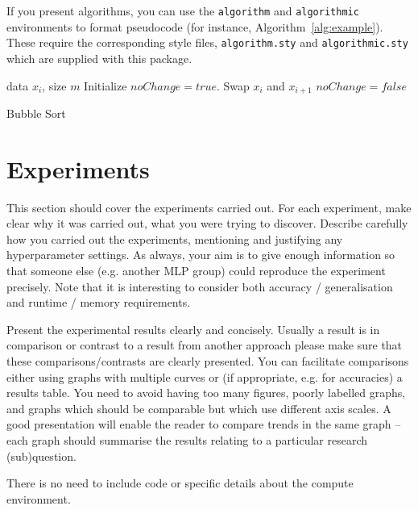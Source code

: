 \documentclass{article}
\begin{document}
If you present algorithms, you can use the \verb+algorithm+ and \verb+algorithmic+ environments to format pseudocode (for instance, Algorithm~\ref{alg:example}). These require the corresponding style files, \verb+algorithm.sty+ and \verb+algorithmic.sty+ which are supplied with this package. 

\begin{algorithm}[ht]
\begin{algorithmic}
    data $x_i$, size $m$
   \REPEAT
   \STATE Initialize $noChange = true$.
   \STATE Swap $x_i$ and $x_{i+1}$
   \STATE $noChange = false$
   \ENDIF
   \ENDFOR
\end{algorithmic}
  \caption{Bubble Sort}
  \label{alg:example}
\end{algorithm}


\section{Experiments}
This section should cover the experiments carried out. For each experiment, make clear why it was carried out, what you were trying to discover. Describe carefully how you carried out the experiments, mentioning and justifying any hyperparameter settings.  As always, your aim is to give enough information so that someone else (e.g. another MLP group) could reproduce the experiment precisely.  Note that it is interesting to consider both accuracy / generalisation and runtime / memory requirements.

Present the experimental results clearly and concisely.  Usually a result is in comparison or contrast to a result from another approach please make sure that these comparisons/contrasts are clearly presented.  You can facilitate comparisons either using graphs with multiple curves or (if appropriate, e.g. for accuracies) a results table. You need to avoid having too many figures, poorly labelled graphs, and graphs which should be comparable but which use different axis scales. A good presentation will enable the reader to compare trends in the same graph -- each graph should summarise the results relating to a particular research (sub)question.

There is no need to include code or specific details about the compute environment.
\end{document}
